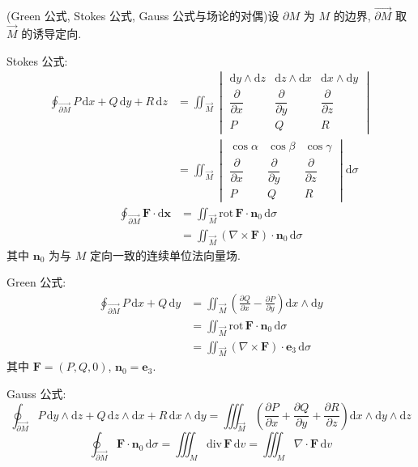 \begin{theorem}\label{thm:11.6.1}
(Green 公式, Stokes 公式, Gauss 公式与场论的对偶)设 $\partial M$ 为 $M$ 的边界, $\overrightarrow{\partial M}$ 取 $\overrightarrow{M}$ 的诱导定向.

Stokes 公式:
\[
\begin{aligned}
\oint_{\overrightarrow{\partial M}}P\,\mathrm{d}x+Q\,\mathrm{d}y+R\,\mathrm{d}z&=\iint_{\overrightarrow{M}}\begin{vmatrix}\mathrm{d}y\wedge\mathrm{d}z&\mathrm{d}z\wedge\mathrm{d}x&\mathrm{d}x\wedge\mathrm{d}y\\ \dfrac{\partial}{\partial x}&\dfrac{\partial}{\partial y}&\dfrac{\partial}{\partial z}\\ P&Q&R\end{vmatrix}\\
&=\iint_{\overrightarrow{M}}\begin{vmatrix}\cos\alpha&\cos\beta&\cos\gamma\\ \dfrac{\partial}{\partial x}&\dfrac{\partial}{\partial y}&\dfrac{\partial}{\partial z}\\ P&Q&R\end{vmatrix}\mathrm{d}\sigma
\end{aligned}
\]
\[
\begin{aligned}
\oint_{\overrightarrow{\partial M}}\boldsymbol{F}\cdot\mathrm{d}\boldsymbol{x}&=\iint_{\overrightarrow{M}}\mathrm{rot}\,\boldsymbol{F}\cdot\boldsymbol{n}_{0}\,\mathrm{d}\sigma\\
&=\iint_{\overrightarrow{M}}(\nabla\times\boldsymbol{F})\cdot\boldsymbol{n}_{0}\,\mathrm{d}\sigma
\end{aligned}
\]
其中 $\boldsymbol{n}_{0}$ 为与 $M$ 定向一致的连续单位法向量场.

Green 公式:
\[
\begin{aligned}
\oint_{\overrightarrow{\partial M}}P\,\mathrm{d}x+Q\,\mathrm{d}y&=\iint_{\overrightarrow{M}}\left(\frac{\partial Q}{\partial x}-\frac{\partial P}{\partial y}\right)\mathrm{d}x\wedge\mathrm{d}y\\
&=\iint_{\overrightarrow{M}}\mathrm{rot}\,\boldsymbol{F}\cdot\boldsymbol{n}_{0}\,\mathrm{d}\sigma\\
&=\iint_{\overrightarrow{M}}(\nabla\times\boldsymbol{F})\cdot\boldsymbol{e}_{3}\,\mathrm{d}\sigma
\end{aligned}
\]
其中 $\boldsymbol{F}=(P,Q,0)$, $\boldsymbol{n}_{0}=\boldsymbol{e}_{3}$.

Gauss 公式:
\[
\oint_{\overrightarrow{\partial M}}P\,\mathrm{d}y\wedge\mathrm{d}z+Q\,\mathrm{d}z\wedge\mathrm{d}x+R\,\mathrm{d}x\wedge\mathrm{d}y=\iiint_{\overrightarrow{M}}\left(\frac{\partial P}{\partial x}+\frac{\partial Q}{\partial y}+\frac{\partial R}{\partial z}\right)\mathrm{d}x\wedge\mathrm{d}y\wedge\mathrm{d}z
\]
\[
\oint_{\overrightarrow{\partial M}}\boldsymbol{F}\cdot\boldsymbol{n}_{0}\,\mathrm{d}\sigma=\iiint_{M}\mathrm{div}\,\boldsymbol{F}\,\mathrm{d}v=\iiint_{M}\nabla\cdot\boldsymbol{F}\,\mathrm{d}v
\]


\end{theorem}
